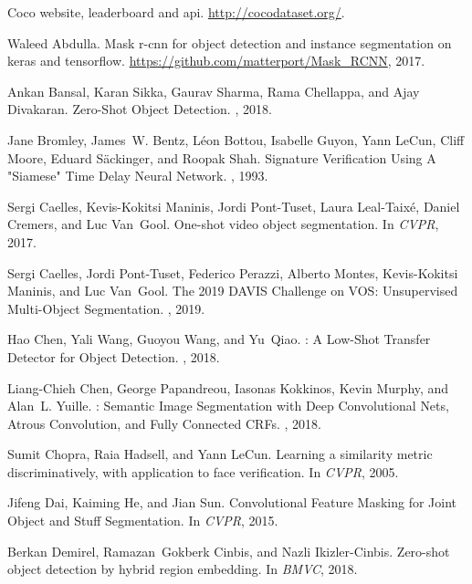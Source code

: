 \documentclass{article}
\begin{document}
{\small
\begin{thebibliography}{10}

Coco website, leaderboard and api.
\newblock \url{http://cocodataset.org/}.

Waleed Abdulla.
\newblock Mask r-cnn for object detection and instance segmentation on keras
  and tensorflow.
\newblock \url{https://github.com/matterport/Mask_RCNN}, 2017.

Ankan Bansal, Karan Sikka, Gaurav Sharma, Rama Chellappa, and Ajay Divakaran.
\newblock Zero-{Shot} {Object} {Detection}.
, 2018.

Jane Bromley, James~W. Bentz, Léon Bottou, Isabelle Guyon, Yann LeCun, Cliff
  Moore, Eduard Säckinger, and Roopak Shah.
\newblock Signature {Verification} {Using} {A} "{Siamese}" {Time} {Delay}
  {Neural} {Network}.
, 1993.

Sergi Caelles, Kevis-Kokitsi Maninis, Jordi Pont-Tuset, Laura Leal-Taixé,
  Daniel Cremers, and Luc Van~Gool.
\newblock One-shot video object segmentation.
\newblock In {\em {CVPR}}, 2017.

Sergi Caelles, Jordi Pont-Tuset, Federico Perazzi, Alberto Montes,
  Kevis-Kokitsi Maninis, and Luc Van~Gool.
\newblock The 2019 {DAVIS} {Challenge} on {VOS}: {Unsupervised} {Multi-Object}
  {Segmentation}.
, 2019.

Hao Chen, Yali Wang, Guoyou Wang, and Yu~Qiao.
: {A} {Low}-{Shot} {Transfer} {Detector} for {Object}
  {Detection}.
, 2018.

Liang-Chieh Chen, George Papandreou, Iasonas Kokkinos, Kevin Murphy, and
  Alan~L. Yuille.
: {Semantic} {Image} {Segmentation} with {Deep}
  {Convolutional} {Nets}, {Atrous} {Convolution}, and {Fully} {Connected}
  {CRFs}.
, 2018.

Sumit Chopra, Raia Hadsell, and Yann LeCun.
\newblock Learning a similarity metric discriminatively, with application to
  face verification.
\newblock In {\em {CVPR}}, 2005.

Jifeng Dai, Kaiming He, and Jian Sun.
\newblock Convolutional {Feature} {Masking} for {Joint} {Object} and {Stuff}
  {Segmentation}.
\newblock In {\em {CVPR}}, 2015.

Berkan Demirel, Ramazan~Gokberk Cinbis, and Nazli Ikizler-Cinbis.
\newblock Zero-shot object detection by hybrid region embedding.
\newblock In {\em BMVC}, 2018.


\end{thebibliography}}
\end{document}
